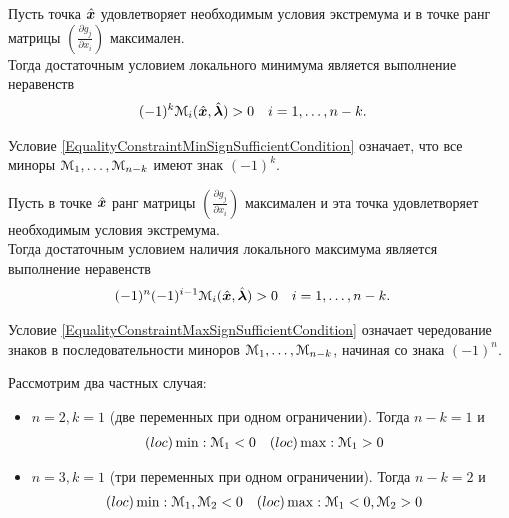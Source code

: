 \begin{teorema}\label{EqualityConstraintMinSufficientCondition}
Пусть точка $\hat{{\bm x}}$ удовлетворяет необходимым условия экстремума и в точке 
ранг матрицы $(\frac{\partial g_j}{\partial x_i})$ максимален.\\
Тогда достаточным условием локального минимума является выполнение неравенств
\begin{align}\label{EqualityConstraintMinSignSufficientCondition}
	(-1)^k{\mathcal M}_i(\hat{{\bm x}},\hat{{\bm{ \lambda}}})&>0 & 
	i&=1,\ldots,n-k.
\end{align}
\end{teorema}
\begin{remark}
Условие \eqref{EqualityConstraintMinSignSufficientCondition} означает, что
все миноры ${\mathcal M}_1,\ldots,{\mathcal M}_{n-k}$ имеют знак $(-1)^k$.
\end{remark}

\begin{teorema}\label{EqualityConstraintMaxSufficientCondition}
Пусть в точке $\hat{{\bm x}}$  ранг матрицы $(\frac{\partial g_j}{\partial x_i})$ максимален и 
эта точка удовлетворяет необходимым условия экстремума.\\
Тогда достаточным условием наличия локального максимума является выполнение неравенств
\begin{align}\label{EqualityConstraintMaxSignSufficientCondition}
	(-1)^n(-1)^{i-1}{\mathcal M}_i(\hat{{\bm x}},\hat{{\bm{ \lambda}}})&>0 & 
	i&=1,\ldots,n-k.
\end{align}
\end{teorema}
\begin{remark}
Условие \eqref{EqualityConstraintMaxSignSufficientCondition} означает чередование знаков
в последовательности миноров ${\mathcal M}_1,\ldots,{\mathcal M}_{n-k}$, начиная со знака $(-1)^n$.
\end{remark}
Рассмотрим два частных случая:
\begin{itemize}
	\item \(n=2,k=1\) (две переменных при одном ограничении). Тогда 
	\(n-k=1\) и 
	\begin{align*}
		(loc)\min:&\; {\mathcal M}_1<0 & (loc)\max:&\; {\mathcal M}_1>0
	\end{align*}
	\item \(n=3,k=1\) (три переменных при одном ограничении). Тогда 
	\(n-k=2\) и 
	\begin{align*}
		(loc)\min:&\; {\mathcal M}_1,{\mathcal M}_2<0 & 
		(loc)\max:&\; {\mathcal M}_1<0,{\mathcal M}_2>0
	\end{align*}
\end{itemize}
	
